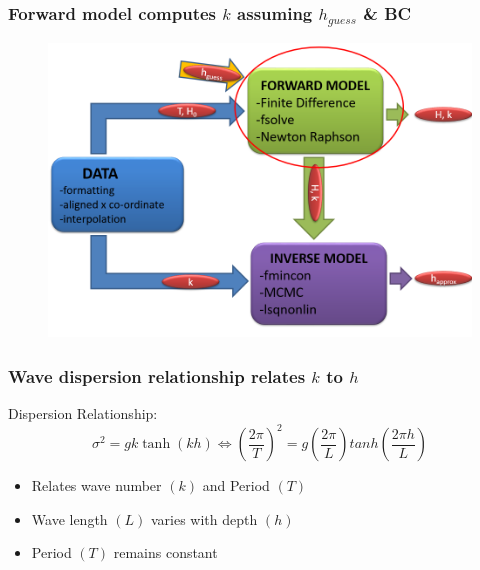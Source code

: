 \documentclass[7pt]{beamer}
\begin{document}
\begin{frame}
 	\frametitle{Forward model computes $k$ assuming $h_{guess}$ \& BC}
		\begin{figure}[H]
	 		\centering
	 		\includegraphics[width=1.0\linewidth]{img/Flow_New.png}
	 	\end{figure}
\end{frame}

\begin{frame}
	\frametitle{Wave dispersion relationship relates $k$ to $h$}
		Dispersion Relationship:
		$$ \sigma^2=gk\tanh(kh) \Longleftrightarrow \left(\frac{2\pi}{T}\right)^2 = g\left(\frac{2\pi}{L}\right) tanh \left(\frac{2\pi h}{L}\right)
		$$
		\begin{itemize}
			\item Relates wave number $(k)$ and Period $(T)$
			\item Wave length $(L)$ varies with depth $(h)$
			\item Period $(T)$ remains constant
		\end{itemize}
\end{frame}
\end{document}

